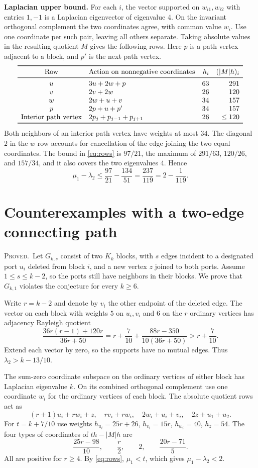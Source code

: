 \documentclass[11pt,a4paper]{article}
\newcommand{\gap}{\mu_1-\lambda_2}
\newcommand{\proved}{\textsc{Proved.}}
\begin{document}
\textbf{Laplacian upper bound.} For each $i$, the vector supported on $w_{i1},w_{i2}$ with entries $1,-1$ is a Laplacian eigenvector of eigenvalue $4$. On the invariant orthogonal complement the two coordinates agree, with common value $w_i$. Use one coordinate per such pair, leaving all others separate. Taking absolute values in the resulting quotient $M$ gives the following rows. Here $p$ is a path vertex adjacent to a block, and $p'$ is the next path vertex.
\[
\begin{array}{c@{\quad}l@{\quad}r@{\quad}r}
\toprule
\text{Row}&\text{Action on nonnegative coordinates}&h_i&(|M|h)_i\\
\midrule
u&3u+2w+p&63&291\\
v&2v+2w&26&120\\
w&2w+u+v&34&157\\
p&2p+u+p'&34&157\\
\text{Interior path vertex}&2p_j+p_{j-1}+p_{j+1}&26&\le120\\
\bottomrule
\end{array}
\]
Both neighbors of an interior path vertex have weights at most $34$. The diagonal $2$ in the $w$ row accounts for cancellation of the edge joining the two equal coordinates. The bound in \eqref{eq:rows} is $97/21$, the maximum of $291/63$, $120/26$, and $157/34$, and it also covers the two eigenvalues $4$. Hence
\[
\gap\le\frac{97}{21}-\frac{134}{51}=\frac{237}{119}=2-\frac1{119}.
\]

\section{Counterexamples with a two-edge connecting path}

\proved\ Let $G_{k,s}$ consist of two $K_k$ blocks, with $s$ edges incident to a designated port $u_i$ deleted from block $i$, and a new vertex $z$ joined to both ports. Assume $1\le s\le k-2$, so the ports still have neighbors in their blocks. We prove that $G_{k,1}$ violates the conjecture for every $k\ge6$.

Write $r=k-2$ and denote by $v_i$ the other endpoint of the deleted edge. The vector on each block with weights $5$ on $u_i,v_i$ and $6$ on the $r$ ordinary vertices has adjacency Rayleigh quotient
\[
\frac{36r(r-1)+120r}{36r+50}
=r+\frac7{10}+\frac{88r-350}{10(36r+50)}>r+\frac7{10}.
\]
Extend each vector by zero, so the supports have no mutual edges. Thus $\lambda_2>k-13/10$.

The sum-zero coordinate subspace on the ordinary vertices of either block has Laplacian eigenvalue $k$. On its combined orthogonal complement use one coordinate $w_i$ for the ordinary vertices of each block. The absolute quotient rows act as
\[
(r+1)u_i+rw_i+z,\quad rv_i+rw_i,\quad 2w_i+u_i+v_i,\quad 2z+u_1+u_2.
\]
For $t=k+7/10$ use weights $h_{u_i}=25r+26$, $h_{v_i}=15r$, $h_{w_i}=40$, $h_z=54$. The four types of coordinates of $th-|M|h$ are
\[
\frac{25r-98}{10},\qquad \frac r2,\qquad 2,\qquad \frac{20r-71}{5}.
\]
All are positive for $r\ge4$. By \eqref{eq:rows}, $\mu_1<t$, which gives $\gap<2$.
\end{document}
